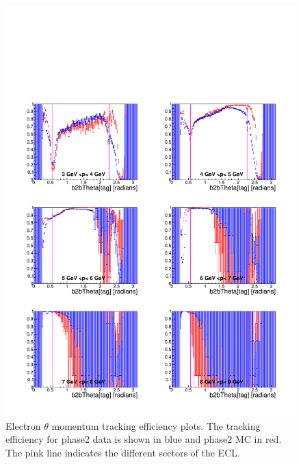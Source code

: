 \documentclass[a4paper,11pt,twosided,final,german,openbib,pdftex,listof=totoc,bibliography=totoc]{scrbook}
\begin{document}
\begin{figure}[!htbp]
	\centering
	\includegraphics[width=\textwidth]{Plots/master/xPMThetaem}
	\caption[Momentum $\theta$ Electron Efficiency Phase2]{Electron $\theta$ momentum tracking efficiency plots. The tracking efficiency for phase2 data is shown in blue and phase2 MC in red. The pink line indicates the different sectors of the ECL.}
	
	\label{plt:xPMThetaem}
\end{figure}
\end{document}
